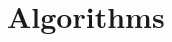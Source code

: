 \documentclass{article}
\let\oldref\ref
\renewcommand{\ref}[1]{(\oldref{#1})}
\begin{document}











\section{Algorithms}
\label{feasiblemethod}
\end{document}
